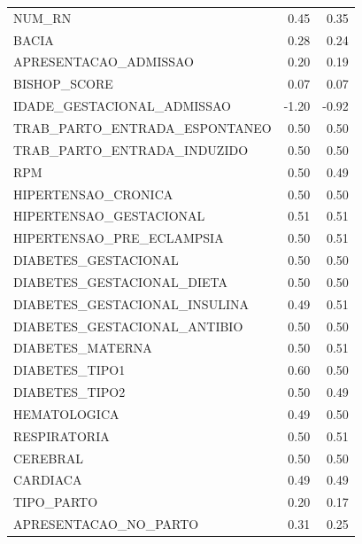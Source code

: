 \documentclass{article}
\begin{document}
\begin{longtable}{lrr}
NUM\_RN                        &            0.45 &            0.35 \\
BACIA                         &            0.28 &            0.24 \\
APRESENTACAO\_ADMISSAO         &            0.20 &            0.19 \\
BISHOP\_SCORE                  &            0.07 &            0.07 \\
IDADE\_GESTACIONAL\_ADMISSAO    &           -1.20 &           -0.92 \\
TRAB\_PARTO\_ENTRADA\_ESPONTANEO &            0.50 &            0.50 \\
TRAB\_PARTO\_ENTRADA\_INDUZIDO   &            0.50 &            0.50 \\
RPM                           &            0.50 &            0.49 \\
HIPERTENSAO\_CRONICA           &            0.50 &            0.50 \\
HIPERTENSAO\_GESTACIONAL       &            0.51 &            0.51 \\
HIPERTENSAO\_PRE\_ECLAMPSIA     &            0.50 &            0.51 \\
DIABETES\_GESTACIONAL          &            0.50 &            0.50 \\
DIABETES\_GESTACIONAL\_DIETA    &            0.50 &            0.50 \\
DIABETES\_GESTACIONAL\_INSULINA &            0.49 &            0.51 \\
DIABETES\_GESTACIONAL\_ANTIBIO  &            0.50 &            0.50 \\
DIABETES\_MATERNA              &            0.50 &            0.51 \\
DIABETES\_TIPO1                &            0.60 &            0.50 \\
DIABETES\_TIPO2                &            0.50 &            0.49 \\
HEMATOLOGICA                  &            0.49 &            0.50 \\
RESPIRATORIA                  &            0.50 &            0.51 \\
CEREBRAL                      &            0.50 &            0.50 \\
CARDIACA                      &            0.49 &            0.49 \\
TIPO\_PARTO                    &            0.20 &            0.17 \\
APRESENTACAO\_NO\_PARTO         &            0.31 &            0.25 \\

\end{longtable}
\end{document}
